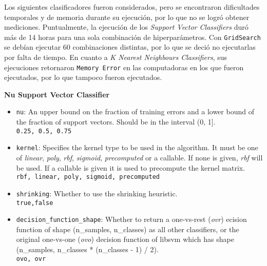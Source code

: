 \noindent Los siguientes clasificadores fueron considerados, pero se encontraron dificultades temporales y de memoria durante su ejecuci\'on, por lo que no se logr\'o obtener mediciones.
Puntualmente, la ejecuci\'on de los \emph{Support Vector Classifiers} dur\'o m\'as de 14 horas para una sola combinaci\'on de hiperpar\'ametros. Con \texttt{GridSearch} se deb\'ian ejecutar 60 combinaciones distintas, por lo que se deci\'o no ejecutarlas por falta de tiempo.
En cuanto a \emph{K Nearest Neighbours Classifiers}, sus ejecuciones retornaron \texttt{Memory Error} en las computadoras en los que fueron ejecutados, por lo que tampoco fueron ejecutados.

\noindent \textbf{Nu Support Vector Classifier}
\begin{itemize}
  \item \texttt{nu}: An upper bound on the fraction of training errors and a lower bound of the fraction of support vectors. Should be in the interval (0, 1].\\
  \texttt{0.25, 0.5, 0.75}
  \item \texttt{kernel}: Specifies the kernel type to be used in the algorithm. It must be one of \emph{linear}, \emph{poly}, \emph{rbf}, \emph{sigmoid}, \emph{precomputed} or a callable. If none is given, \emph{rbf} will be used. If a callable is given it is used to precompute the kernel matrix.\\
  \texttt{rbf, linear, poly, sigmoid, precomputed}
  \item \texttt{shrinking}: Whether to use the shrinking heuristic.\\
  \texttt{true,false}
  \item \texttt{decision\_function\_shape}: Whether to return a one-vs-rest (\emph{ovr}) ecision function of shape (n\_samples, n\_classes) as all other classifiers, or the original one-vs-one (\emph{ovo}) decision function of libsvm which has shape (n\_samples, n\_classes * (n\_classes - 1) / 2).\\
  \texttt{ovo, ovr}
\end{itemize}

